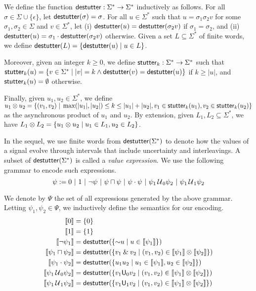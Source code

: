 We define the function $\mathsf{destutter} : \Sigma^* \to \Sigma^*$ inductively as follows.
For all $\sigma \in \Sigma \cup \{\epsilon\}$, let $\mathsf{destutter}(\sigma) = \sigma$.
For all $u \in \Sigma^*$ such that $u = \sigma_1 \sigma_2 v$ for some $\sigma_1,\sigma_2 \in \Sigma$ and $v \in \Sigma^*$, let (i) $\mathsf{destutter}(u) = \mathsf{destutter}(\sigma_2 v)$ if $\sigma_1 = \sigma_2$, and (ii) $\mathsf{destutter}(u) = \sigma_1 \cdot \mathsf{destutter}(\sigma_2 v)$ otherwise.
Given a set $L \subseteq \Sigma^*$ of finite words, we define $\destutter(L) = \{\destutter(u) \st u \in L\}$.

Moreover, given an integer $k \geq 0$, we define $\mathsf{stutter}_k : \Sigma^* \to \Sigma^*$ such that $\stutter_k(u) = \{v \in \Sigma^* \st |v| = k \land \destutter(v) = \destutter(u)\}$ if $k \geq |u|$, and $\mathsf{stutter}_k(u) = \emptyset$ otherwise.

Finally, given $u_1, u_2 \in \Sigma^*$, we define $u_1 \otimes u_2 = \{ (v_1,v_2) \st \max(|u_1|, |u_2|) \leq k \leq |u_1| + |u_2|, v_1 \in \stutter_k(u_1), v_2 \in \stutter_k(u_2) \}$ as the asynchronous product of $u_1$ and $u_2$.
By extension, given $L_1, L_2 \subseteq \Sigma^*$, we have $L_1 \otimes L_2 = \{ u_1 \otimes u_2 \st u_1 \in L_1, u_2 \in L_2 \}$.

In the sequel, we use finite words from $\mathsf{destutter}(\Sigma^*)$ to denote how the values of a signal evolve through intervals that include uncertainty and interleavings.
A subset of $\mathsf{destutter}(\Sigma^*)$ is called a \emph{value expression}.
We use the following grammar to encode such expressions. 
$$ \psi := 0 ~|~ 1 ~|~ \lnot \psi ~|~ \psi \sqcap \psi  ~|~ \psi \cdot \psi ~|~ \psi_1 \,\mathcal{U}\,_{\!0} \psi_2 ~|~ \psi_1 \,\mathcal{U}\,_{\!1} \psi_2 $$  %

We denote by $\Psi$ the set of all expressions generated by the above grammar.
Letting $\psi_1, \psi_2 \in \Psi$, we inductively define the semantics for our encoding.
\begin{align*}
		\llbracket 0 \rrbracket &=  \{ 0 \} \\
		\llbracket 1 \rrbracket &=  \{ 1 \} \\
		\llbracket \lnot \psi_1 \rrbracket &= \destutter(\{ \BitNeg u \st u \in \llbracket \psi_1 \rrbracket \}) \\
		\llbracket \psi_1 \sqcap \psi_2 \rrbracket &= \destutter(\{ v_1 \BitAnd v_2 \st (v_1,v_2) \in \llbracket \psi_1 \rrbracket \otimes \llbracket \psi_2 \rrbracket \}) \\
		\llbracket \psi_1 \cdot \psi_2 \rrbracket &= \destutter(\{ u_1 u_2 \st u_1 \in \llbracket \psi_1 \rrbracket, u_2 \in \llbracket \psi_2 \rrbracket \}) \\
		\llbracket \psi_1 \until_{\!0} \psi_2 \rrbracket &= \destutter(\{ v_1 \mathsf{U}_0 v_2  \st (v_1,v_2) \in \llbracket \psi_1 \rrbracket \otimes \llbracket \psi_2 \rrbracket \}) \\
		\llbracket \psi_1 \until_{\!1} \psi_2 \rrbracket &= \destutter(\{ v_1 \mathsf{U}_1 v_2  \st (v_1,v_2) \in \llbracket \psi_1 \rrbracket \otimes \llbracket \psi_2 \rrbracket \}) \\
\end{align*}

